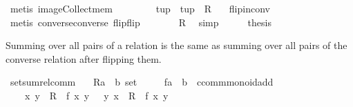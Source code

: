 \begin{isabellebody}
\ {\isacharparenleft}metis\ image{\isacharunderscore}Collect{\isacharunderscore}mem{\isacharparenright}\isanewline
\ \ \isamarkupfalse%
\ \isamarkupfalse%
\ {\isachardoublequoteopen}{\isasymdots}\ {\isacharequal}\ {\isacharbraceleft}\ tup\ {\isachardot}\ tup\ {\isasymin}\ R{\isasyminverse}\ {\isacharbraceright}{\isachardoublequoteclose}\ \isamarkupfalse%
\ flip{\isacharunderscore}in{\isacharunderscore}conv\ \isamarkupfalse%
\ {\isacharparenleft}metis\ converse{\isacharunderscore}converse\ flip{\isacharunderscore}flip{\isacharparenright}\isanewline
\ \ \isamarkupfalse%
\ \isamarkupfalse%
\ {\isachardoublequoteopen}{\isasymdots}\ {\isacharequal}\ R{\isasyminverse}{\isachardoublequoteclose}\ \isamarkupfalse%
\ simp\isanewline
\ \ \isamarkupfalse%
\ \isamarkupfalse%
\ {\isacharquery}thesis\ \isacommand{{\isachardot}}\isamarkupfalse%
\isanewline
{}\isamarkupfalse%
%
\endisatagproof
{\isafoldproof}%
%
\isadelimproof
%
\endisadelimproof
%
\begin{isamarkuptext}%
Summing over all pairs of a relation is the same as summing over all pairs of the
  converse relation after flipping them.%
\end{isamarkuptext}%
\isamarkuptrue%
\isamarkupfalse%
\ setsum{\isacharunderscore}rel{\isacharunderscore}comm{\isacharcolon}\isanewline
\ \ \ R{\isacharcolon}{\isacharcolon}{\isachardoublequoteopen}{\isacharparenleft}{\isacharprime}a\ {\isasymtimes}\ {\isacharprime}b{\isacharparenright}\ set{\isachardoublequoteclose}\isanewline
\ \ \ \ \ f{\isacharcolon}{\isacharcolon}{\isachardoublequoteopen}{\isacharprime}a\ {\isasymRightarrow}\ {\isacharprime}b\ {\isasymRightarrow}\ {\isacharprime}c{\isasymColon}comm{\isacharunderscore}monoid{\isacharunderscore}add{\isachardoublequoteclose}\isanewline
\ \ \ {\isachardoublequoteopen}{\isacharparenleft}{\isasymSum}\ {\isacharparenleft}x{\isacharcomma}\ y{\isacharparenright}\ {\isasymin}\ R\ {\isachardot}\ f\ x\ y{\isacharparenright}\ {\isacharequal}\ {\isacharparenleft}{\isasymSum}\ {\isacharparenleft}y{\isacharprime}{\isacharcomma}\ x{\isacharprime}{\isacharparenright}\ {\isasymin}\ R{\isasyminverse}\ {\isachardot}\ f\ x{\isacharprime}\ y{\isacharprime}{\isacharparenright}{\isachardoublequoteclose}\isanewline
%
\isadelimproof
%
\endisadelimproof
%
\isatagproof
{}\isamarkupfalse%
\ {\isacharminus}\isanewline
\ \ \isanewline

\end{isabellebody}
